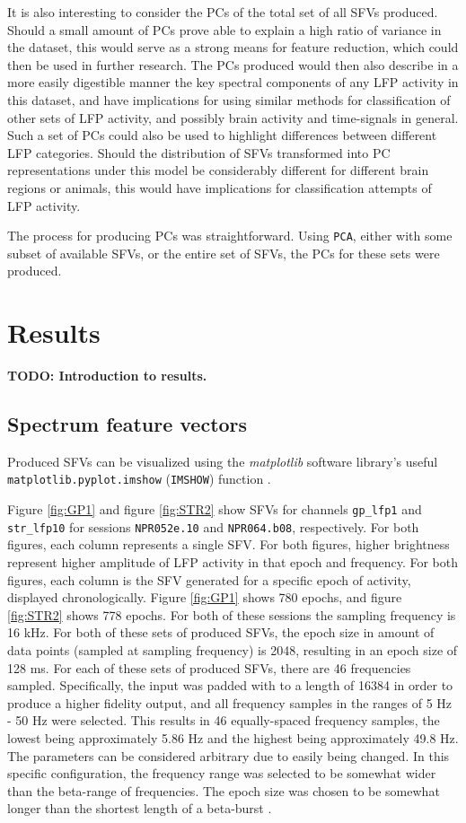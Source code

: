 \documentclass{article}
\begin{document}
It is also interesting to consider the PCs of the total set of all SFVs produced. 
Should a small amount of PCs prove able to explain a high ratio of variance in the dataset, this would serve as a strong means for feature reduction, which could then be used in further research.
The PCs produced would then also describe in a more easily digestible manner the key spectral components of any LFP activity in this dataset, and have implications for using similar methods for classification of other sets of LFP activity, and possibly brain activity and time-signals in general.
Such a set of PCs could also be used to highlight differences between different LFP categories.
Should the distribution of SFVs transformed into PC representations under this model be considerably different for different brain regions or animals, this would have implications for classification attempts of LFP activity.

The process for producing PCs was straightforward.
Using \texttt{PCA}, either with some subset of available SFVs, or the entire set of SFVs, the PCs for these sets were produced.

\newpage
\section{Results}

\textbf{TODO: Introduction to results.}

\subsection{Spectrum feature vectors}\label{SFV Results}
Produced SFVs can be visualized using the \textit{matplotlib} software library's useful \texttt{matplotlib.pyplot.imshow} (\texttt{IMSHOW}) function \citep{MPL}.

Figure \ref{fig:GP1} and figure \ref{fig:STR2} show SFVs for channels \texttt{gp\_lfp1} and \texttt{str\_lfp10} for sessions \texttt{NPR052e.10} and \texttt{NPR064.b08}, respectively. 
For both figures, each column represents a single SFV. 
For both figures, higher brightness represent higher amplitude of LFP activity in that epoch and frequency.
For both figures, each column is the SFV generated for a specific epoch of activity, displayed chronologically. 
Figure \ref{fig:GP1} shows 780 epochs, and figure \ref{fig:STR2} shows 778 epochs. 
For both of these sessions the sampling frequency is 16 kHz. 
For both of these sets of produced SFVs, the epoch size in amount of data points (sampled at sampling frequency) is 2048, resulting in an epoch size of 128 ms. 
For each of these sets of produced SFVs, there are 46 frequencies sampled. 
Specifically, the input was padded with to a length of 16384 in order to produce a higher fidelity output, and all frequency samples in the ranges of 5 Hz - 50 Hz were selected. 
This results in 46 equally-spaced frequency samples, the lowest being approximately 5.86 Hz and the highest being approximately 49.8 Hz. 
The parameters can be considered arbitrary due to easily being changed.
In this specific configuration, the frequency range was selected to be somewhat wider than the beta-range of frequencies.
The epoch size was chosen to be somewhat longer than the shortest length of a beta-burst \citep{Cagnan}.
\end{document}
